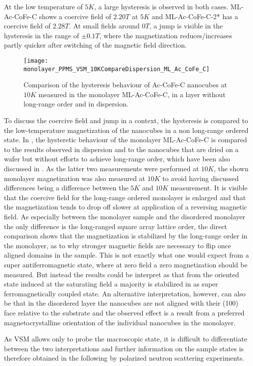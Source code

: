 \documentclass[\main/dresen_thesis.tex]{subfiles}
\begin{document}
  At the low temperature of $5 \unit{K}$, a large hysteresis is observed in both cases.
  ML-Ac-CoFe-C shows a coercive field of $2.20 \unit{T}$ at $5 \unit{K}$ and ML-Ac-CoFe-C-2* has a coercive field of $2.28 \unit{T}$.
  At small fields around $0 \unit{T}$, a jump is visible in the hysteresis in the range of $\pm 0.1 \unit{T}$, where the magnetization reduces/increases partly quicker after switching of the magnetic field direction.

  \begin{figure}[tb]
    \centering
    \texttt{[image: monolayer\_PPMS\_VSM\_10KCompareDispersion\_ML\_Ac\_CoFe\_C]}
    \caption{\label{fig:monolayer:magneticStructure:MLAcCoFeCCompareDispWafer}Comparison of the hysteresis behaviour of Ac-CoFe-C nanocubes at $10 \unit{K}$ measured in the monolayer ML-Ac-CoFe-C, in a layer without long-range order and in dispersion.}
  \end{figure}

  To discuss the coercive field and jump in a context, the hysteresis is compared to the low-temperature magnetization of the nanocubes in a non long-range ordered state.
  In , the hysteretic behaviour of the monolayer ML-Ac-CoFe-C is compared to the results observed in dispersion and to the nanocubes that are dried on a wafer but without efforts to achieve long-range order, which have been also discussed in .
  As the latter two measurements were performed at $10 \unit{K}$, the shown monolayer magnetization was also measured at $10 \unit{K}$ to avoid having discussed differences being a difference between the $5 \unit{K}$ and $10 \unit{K}$ measurement.
  It is visible that the coercive field for the long-range ordered monolayer is enlarged and that the magnetization tends to drop off slower at application of a reversing magnetic field.
  As especially between the monolayer sample and the disordered monolayer the only difference is the long-ranged square array lattice order, the direct comparison shows that the magnetization is stabilized by the long-range order in the monolayer, as to why stronger magnetic fields are necessary to flip once aligned domains in the sample.
  This is not exactly what one would expect from a super antiferromagnetic state, where at zero field a zero magnetization should be measured.
  But instead the results could be interpret as that from the oriented state induced at the saturating field a majority is stabilized in as super ferromagnetically coupled state.
  An alternative interpretation, however, can also be that in the disordered layer the nanocubes are not aligned with their (100) face relative to the substrate and the observed effect is a result from a preferred magnetocrystalline orientation of the individual nanocubes in the monolayer.

  As VSM allows only to probe the macroscopic state, it is difficult to differentiate between the two interpretations and further information on the sample states is therefore obtained in the following by polarized neutron scattering experiments.
\end{document}
